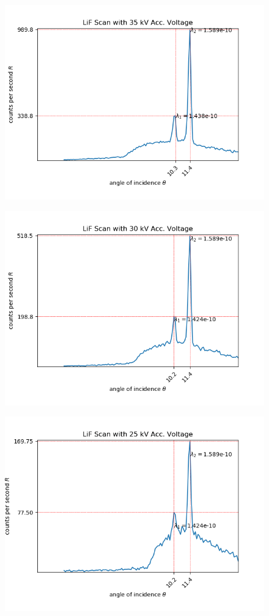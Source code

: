 \documentclass[8pt, a4paper]{article}
\begin{document}
\begin{figure}[h]
\includegraphics{ve1}
\end{figure}

\begin{figure}[h]
\includegraphics{ve2}
\end{figure}

\begin{figure}[h]
\includegraphics{ve3}
\end{figure}
\end{document}
